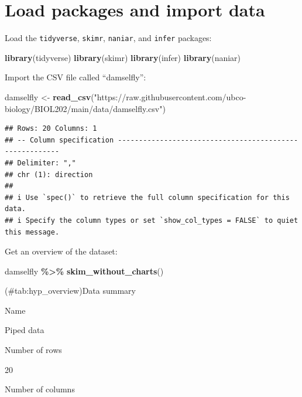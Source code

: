 \documentclass[
]{book}
\newenvironment{Shaded}{\begin{snugshade}}{\end{snugshade}}
\newcommand{\FunctionTok}[1]{\textcolor[rgb]{0.13,0.29,0.53}{\textbf{#1}}}
\newcommand{\NormalTok}[1]{#1}
\newcommand{\OtherTok}[1]{\textcolor[rgb]{0.56,0.35,0.01}{#1}}
\newcommand{\SpecialCharTok}[1]{\textcolor[rgb]{0.81,0.36,0.00}{\textbf{#1}}}
\newcommand{\StringTok}[1]{\textcolor[rgb]{0.31,0.60,0.02}{#1}}
\begin{document}
\section{Load packages and import data}\label{hyp_packages_data}

Load the \texttt{tidyverse}, \texttt{skimr}, \texttt{naniar}, and \texttt{infer} packages:

\begin{Shaded}
\begin{Highlighting}[]
\FunctionTok{library}\NormalTok{(tidyverse)}
\FunctionTok{library}\NormalTok{(skimr)}
\FunctionTok{library}\NormalTok{(infer)}
\FunctionTok{library}\NormalTok{(naniar)}
\end{Highlighting}
\end{Shaded}

Import the CSV file called ``damselfly'':

\begin{Shaded}
\begin{Highlighting}[]
\NormalTok{damselfly }\OtherTok{\textless{}{-}} \FunctionTok{read\_csv}\NormalTok{(}\StringTok{"https://raw.githubusercontent.com/ubco{-}biology/BIOL202/main/data/damselfly.csv"}\NormalTok{)}
\end{Highlighting}
\end{Shaded}

\begin{verbatim}
## Rows: 20 Columns: 1
## -- Column specification --------------------------------------------------------
## Delimiter: ","
## chr (1): direction
## 
## i Use `spec()` to retrieve the full column specification for this data.
## i Specify the column types or set `show_col_types = FALSE` to quiet this message.
\end{verbatim}

Get an overview of the dataset:

\begin{Shaded}
\begin{Highlighting}[]
\NormalTok{damselfly }\SpecialCharTok{\%\textgreater{}\%}
  \FunctionTok{skim\_without\_charts}\NormalTok{()}
\end{Highlighting}
\end{Shaded}

(\#tab:hyp\_overview)Data summary

Name

Piped data

Number of rows

20

Number of columns
\end{document}
